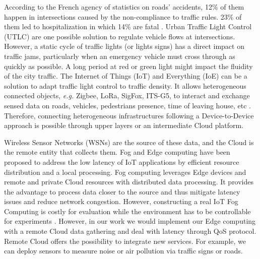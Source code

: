 
According to the French agency of statistics on roads' accidents, 12\%  of them happen in intersections caused by the non-compliance to traffic rules. 23\% of them led to hospitalization in which 14\% are fatal \cite{Routiere2015}. Urban Traffic Light Control (UTLC) are one possible solution to regulate vehicle flows at intersections. However, a static cycle of traffic lights (or lights signs) has a direct impact on traffic jams, particularly when an emergency vehicle must cross through as quickly as possible. A long period at red or green light might impact the fluidity of the city traffic. 
The Internet of Things (IoT) and Everything (IoE) can be a solution to adapt traffic light control to traffic density. It allows heterogeneous connected objects, \textit{e.g.} Zigbee, LoRa, SigFox, ITS-G5, to interact and exchange sensed data on roads, vehicles, pedestrians presence, time of leaving house, etc  \cite{Perera2014}. Therefore, connecting heterogeneous infrastructures following a Device-to-Device approach is possible through upper layers or an intermediate Cloud platform.

Wireless Sensor Networks (WSNs) are the source of these data, and the Cloud is the remote entity that collects them. Fog and Edge computing have been proposed to address the low latency of IoT applications by efficient resource distribution and a local processing. Fog computing leverages Edge devices and remote and private Cloud resources with distributed data processing. It provides the advantage to process data closer to the source and thus mitigate latency issues and reduce network congestion. However, constructing a real IoT Fog Computing is costly for evaluation while the environment has to be controllable for experiments \cite{Dastjerdi2016}. However, in our work we would implement our Edge computing with a remote Cloud data gathering and deal with latency through QoS protocol. Remote Cloud offers the possibility to integrate new services. For example, we can deploy sensors to measure noise or air pollution via traffic signs or roads.

